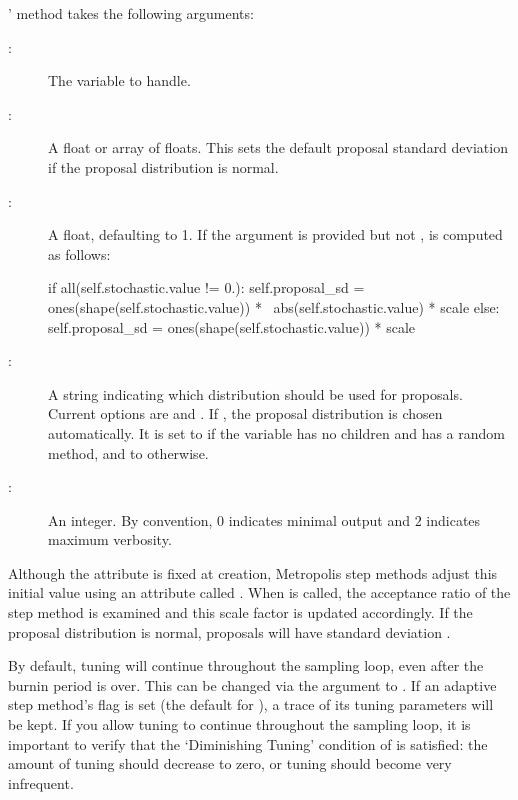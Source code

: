\documentclass[]{jss}
\begin{document}
'  method takes the following arguments:
\begin{description}
   \item[:] The variable to handle.
   \item[:] A float or array of floats. This sets the
    default proposal standard deviation if the proposal distribution is normal.
   \item[:] A float, defaulting to 1. If the  argument is provided but not ,  is computed as follows:
   \begin{CodeInput}
if all(self.stochastic.value != 0.):
   self.proposal_sd = ones(shape(self.stochastic.value)) * \
                       abs(self.stochastic.value) * scale
else:
   self.proposal_sd = ones(shape(self.stochastic.value)) * scale
\end{CodeInput}
   \item[:] A string indicating which distribution should be used for proposals. Current options are  and . If , the proposal distribution is chosen automatically. It is set to  if the variable has no children and has a random method, and to  otherwise.
   \item[\code{verbose}:] An integer. By convention, $0$ indicates minimal output and $2$ indicates maximum verbosity.
\end{description}

Although the  attribute is fixed at creation, Metropolis step methods adjust this initial value using an attribute called . When  is called, the acceptance ratio of the step method is examined and this scale factor is updated accordingly. If the proposal distribution is normal, proposals will have standard deviation .

By default, tuning will continue throughout the sampling loop, even after the burnin period is over. This can be changed via the  argument to . If an adaptive step method's  flag is set (the default for ), a trace of its tuning parameters will be kept. If you allow tuning to continue throughout the sampling loop, it is important to verify that the `Diminishing Tuning' condition of \citet{tuning} is satisfied: the amount of tuning should decrease to zero, or tuning should become very infrequent.
\end{document}
